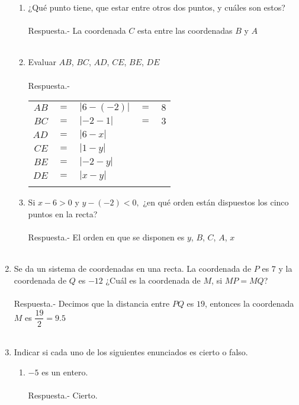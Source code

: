 \begin{enumerate}
\begin{enumerate}[\bfseries (a)]
\item ¿Qué punto tiene, que estar entre otros dos puntos, y cuáles son estos?\\\\
Respuesta.- \; La coordenada $C$ esta entre las coordenadas $B$ y $A$\\\\
\item Evaluar $AB$, $BC$, $AD$, $CE$, $BE$, $DE$\\\\
Respuesta.- \; 
\begin{center}
\begin{tabular}{r c l c l}
$AB$&$=$&$|6-(-2)|$&$=$&$8$\\
$BC$&$=$&$|-2-1|$&$=$&$3$\\
$AD$&$=$&$|6-x|$&&\\
$CE$&$=$&$|1-y|$&&\\
$BE$&$=$&$|-2-y|$&&\\
$DE$&$=$&$|x-y|$&&\\\\
\end{tabular}
\end{center}
\item Si $x-6>0$ y $y-(-2)<0,$ ¿en qué orden están dispuestos los cinco puntos en la recta?\\\\
Respuesta.- \; El orden en que se disponen es $y$, $B$, $C$, $A$, $x$\\\\
\end{enumerate}

\item Se da un sistema de coordenadas en una recta. La coordenada de $P$ es $7$ y la coordenada de $Q$ es $-12$ ¿Cuál es la coordenada de $M$, si $MP=MQ$?\\\\
Respuesta.- \; Decimos que la distancia entre $PQ $ es $19$, entonces la coordenada $M$ es $\dfrac{19}{2} = 9.5$\\\\

\item Indicar si cada uno de los siguientes enunciados es cierto o falso.
\begin{enumerate}[\bfseries (a)]
\item $-5$ es un entero.\\\\
Respuesta.- \; Cierto.\\\\


\end{enumerate}
\end{enumerate}

